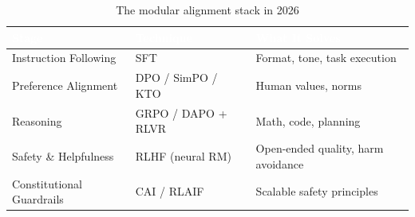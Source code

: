 \begin{table}[H]
\centering\small\sffamily
{}
\begin{tabular}{L{2.8cm}L{3.5cm}L{4.2cm}}
\toprule
{}\textcolor{white}{\textbf{Stage}} & \textcolor{white}{\textbf{Technique}} & \textcolor{white}{\textbf{What It Solves}} \\
\midrule
Instruction Following & SFT & Format, tone, task execution \\
Preference Alignment & DPO / SimPO / KTO & Human values, norms \\
Reasoning & GRPO / DAPO + RLVR & Math, code, planning \\
Safety \& Helpfulness & RLHF (neural RM) & Open-ended quality, harm avoidance \\
Constitutional Guardrails & CAI / RLAIF & Scalable safety principles \\
\bottomrule
\end{tabular}
\caption{The modular alignment stack in 2026}
\end{table}
